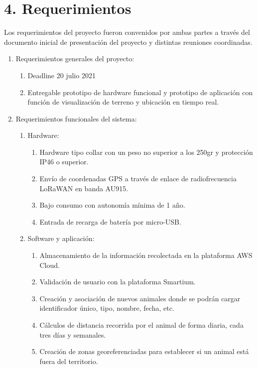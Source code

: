\documentclass[11pt]{charter}
\begin{document}
\section{4. Requerimientos}
\label{sec:requerimientos}

Los requerimientos del proyecto fueron convenidos por ambas partes a través del documento inicial de presentación del proyecto y distintas reuniones coordinadas. 


\begin{enumerate}
\item Requerimientos generales del proyecto:
	\begin{enumerate}
	\item Deadline 20 julio 2021
	\item Entregable prototipo de hardware funcional y prototipo de aplicación con función de visualización de terreno y ubicación en tiempo real. 
	\end{enumerate}
\item Requerimientos funcionales del sistema:
	\begin{enumerate}
	\item Hardware:
		\begin{enumerate}
		\item Hardware tipo collar con un peso no superior a los 250gr y protección IP46 o superior.
		\item Envío de coordenadas GPS a través de enlace de radiofrecuencia LoRaWAN en banda AU915.
		\item Bajo consumo con autonomía mínima de 1 año.
		\item Entrada de recarga de batería por micro-USB.
		\end{enumerate}
	\item Software y aplicación:
		\begin{enumerate}
		\item Almacenamiento de la información recolectada en la plataforma AWS Cloud.
		\item Validación de usuario con la plataforma Smartium.
		\item Creación y asociación de nuevos animales donde se podrán cargar identificador único, tipo, nombre, fecha, etc.
		\item Cálculos de distancia recorrida por el animal de forma diaria, cada tres días y semanales.
		\item Creación de zonas georeferenciadas para establecer si un animal está fuera del territorio.

\end{enumerate}
\end{enumerate}
\end{enumerate}
\end{document}
